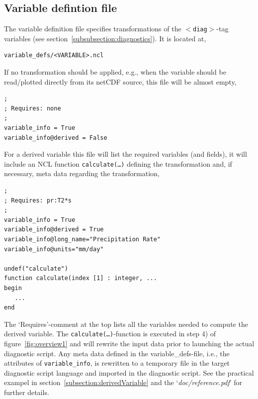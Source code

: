\documentclass[12pt]{article}
\newcommand{\docref}[1]{`\emph{#1}'}
\newcommand{\xmltag}[1]{\texttt{$<$#1$>$}}
\begin{document}
\subsection{Variable defintion file}\label{subsection:variable-definition-file}
The variable definition file specifies transformations of the
\xmltag{diag}-tag variables (see
section~\ref{subsubsection:diagnostics}). It is located at,
\begin{Verbatim}[frame=single, fontsize=\footnotesize]
variable_defs/<VARIABLE>.ncl
\end{Verbatim}
If no transformation should be applied, e.g., when the variable should
be read/plotted  directly from its netCDF source, this file will be
almost empty, 
\begin{Verbatim}[frame=single, fontsize=\footnotesize]
;
; Requires: none
;
variable_info = True
variable_info@derived = False
\end{Verbatim}
For a derived variable this file will list the required variables (and
fields), it will include an NCL function \texttt{calculate(\ldots)}
defining the transformation and, if necessary, meta data regarding the
transformation,
\begin{Verbatim}[frame=single, fontsize=\footnotesize]
;
; Requires: pr:T2*s
;
variable_info = True
variable_info@derived = True
variable_info@long_name="Precipitation Rate"
variable_info@units="mm/day"

undef("calculate")
function calculate(index [1] : integer, ...
begin
   ...
end
\end{Verbatim}
The `Requires'-comment at the top lists all the variables needed to
compute the derived variable. The \texttt{calculate(\ldots)}-function
is executed in step 4) of figure~\ref{fig:overview1} and will rewrite
the input data prior to launching the actual diagnostic script. Any
meta data defined in the variable\_defs-file, i.e., the attributes of
\texttt{variable\_info}, is rewritten to a temporary file in the
target diagnostic script language and imported in the diagnostic
script. See the practical exampel in
section~\ref{subsection:derivedVariable} and the
\docref{doc/reference.pdf} for further details.




% 
% 
\end{document}
